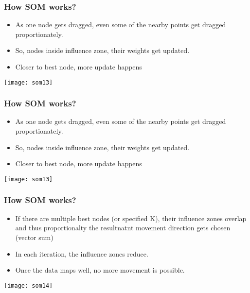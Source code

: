 \begin{frame}[fragile] \frametitle{How SOM works?}
\begin{itemize}
\item As one node gets dragged, even some of the nearby points get dragged proportionately.
\item So, nodes inside influence zone, their weights get updated.
\item Closer to best node, more update happens
\end{itemize}
\begin{center}
\texttt{[image: som13]}
\end{center}
\end{frame}

\begin{frame}[fragile] \frametitle{How SOM works?}
\begin{itemize}
\item As one node gets dragged, even some of the nearby points get dragged proportionately.
\item So, nodes inside influence zone, their weights get updated.
\item Closer to best node, more update happens
\end{itemize}
\begin{center}
\texttt{[image: som13]}
\end{center}
\end{frame}

\begin{frame}[fragile] \frametitle{How SOM works?}
\begin{itemize}
\item If there are multiple best nodes (or specified K), their influence zones overlap and thus proportionalty the resultnatnt movement direction gets chosen (vector sum)
\item In each iteration, the influence zones reduce.
\item Once the data maps well, no more movement is possible.
\end{itemize}
\begin{center}
\texttt{[image: som14]}
\end{center}
\end{frame}


